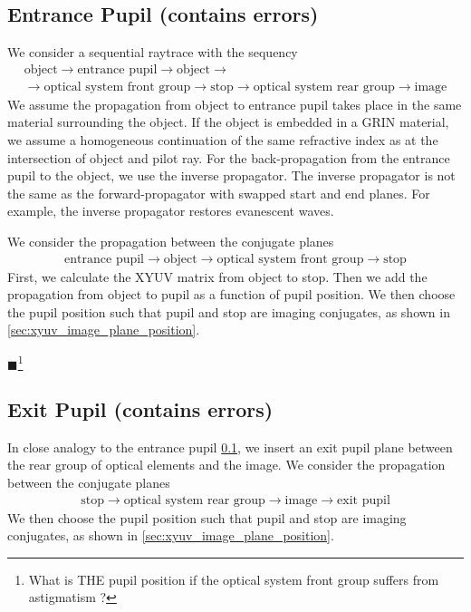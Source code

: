 \documentclass[12pt,a4paper,twoside,openright,BCOR10mm,headsepline,titlepage,abstracton,chapterprefix,final]{scrreprt}
\newcommand{\remark}[1]{{\color{red}$\blacksquare$}\footnote{{\color{red}#1}}}
\begin{document}
\subsection{Entrance Pupil (contains errors)} \label{sec:xyuv_entrance_pupil}
We consider a sequential raytrace with the sequency
\begin{eqnarray*}
 \textrm{object} \rightarrow 
 \textrm{entrance pupil} \rightarrow 
 \textrm{object} \rightarrow
 \\ \rightarrow 
 \textrm{optical system front group} \rightarrow
 \textrm{stop} \rightarrow
 \textrm{optical system rear group} \rightarrow
 \textrm{image}
\end{eqnarray*}
We assume the propagation from object to entrance pupil takes place in the same material surrounding the object.
If the object is embedded in a GRIN material, 
we assume a homogeneous continuation of the same refractive index as at the intersection of object and pilot ray.
For the back-propagation from the entrance pupil to the object, we use the inverse propagator.
The inverse propagator is not the same as the forward-propagator with swapped start and end planes.
For example, the inverse propagator restores evanescent waves.

We consider the propagation between the conjugate planes
\begin{eqnarray*}
 \textrm{entrance pupil} \rightarrow 
 \textrm{object} \rightarrow
 \textrm{optical system front group} \rightarrow
 \textrm{stop} 
\end{eqnarray*}
First, we calculate the XYUV matrix from object to stop. 
Then we add the propagation from object to pupil as a function of pupil position.
We then choose the pupil position such that pupil and stop are imaging conjugates, as shown in \ref{sec:xyuv_image_plane_position}.

\remark{What is THE pupil position if the optical system front group suffers from astigmatism ?}

\subsection{Exit Pupil (contains errors)}
In close analogy to the entrance pupil \ref{sec:xyuv_entrance_pupil}, 
we insert an exit pupil plane between the rear group of optical elements and the image.
We consider the propagation between the conjugate planes
\begin{eqnarray*}
 \textrm{stop} \rightarrow
 \textrm{optical system rear group} \rightarrow
 \textrm{image} \rightarrow
 \textrm{exit pupil}
\end{eqnarray*}
We then choose the pupil position such that pupil and stop are imaging conjugates, as shown in \ref{sec:xyuv_image_plane_position}.
\end{document}
